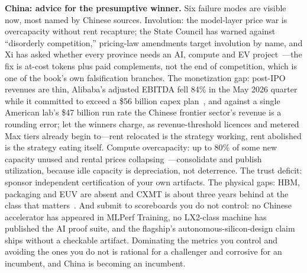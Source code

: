 \textbf{China: advice for the presumptive winner.} Six failure modes are visible now, most named by Chinese sources. Involution: the model-layer price war is overcapacity without rent recapture; the State Council has warned against ``disorderly competition,'' pricing-law amendments target involution by name, and Xi has asked whether every province needs an AI, compute and EV project~\cite{china-involution}---the fix is at-cost tokens plus paid complements, not the end of competition, which is one of the book's own falsification branches. The monetization gap: post-IPO revenues are thin, Alibaba's adjusted EBITDA fell 84\% in the May 2026 quarter while it committed to exceed a \$56 billion capex plan~\cite{alibaba-capex}, and against a single American lab's \$47 billion run rate the Chinese frontier sector's revenue is a rounding error; let the winners charge, as revenue-threshold licences and metered Max tiers already begin to---rent relocated is the strategy working, rent abolished is the strategy eating itself. Compute overcapacity: up to 80\% of some new capacity unused and rental prices collapsing~\cite{china-idle-dc}---consolidate and publish utilization, because idle capacity is depreciation, not deterrence. The trust deficit: sponsor independent certification of your own artifacts. The physical gaps: HBM, packaging and EUV are absent and CXMT is about three years behind at the class that matters~\cite{china-hbm-gap}. And submit to scoreboards you do not control: no Chinese accelerator has appeared in MLPerf Training, no LX2-class machine has published the AI proof suite, and the flagship's autonomous-silicon-design claim ships without a checkable artifact. Dominating the metrics you control and avoiding the ones you do not is rational for a challenger and corrosive for an incumbent, and China is becoming an incumbent.

